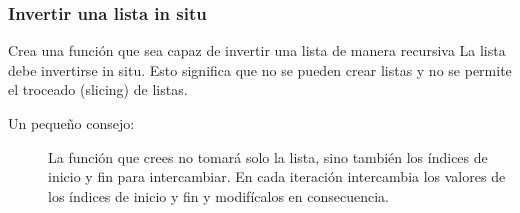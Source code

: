 \documentclass[11pt]{beamer}
\begin{document}
	\begin{frame}\frametitle{Invertir una lista in situ}
	\begin{block}{Crea una función que sea capaz de invertir una lista de manera recursiva}
La lista debe invertirse in situ. Esto significa que no se pueden crear listas y no se permite el troceado (slicing) de listas.
\end{block}
	\begin{description}
	\item[Un pequeño consejo:] La función que crees no tomará solo la lista, sino también los índices de inicio y fin para intercambiar. En cada iteración intercambia los valores de los índices de inicio y fin y modifícalos en consecuencia.
	\end{description}
	\end{frame}

	
\end{document}
